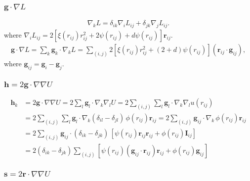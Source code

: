 \documentclass{article}
\begin{document}
\subsubsection{$\mathbf g \cdot \nabla L$}

\begin{align*}
\nabla_k L = \delta_{ik} \nabla_i L_{ij} + \delta_{jk} \nabla_j L_{ij}. 
\end{align*}
where $\nabla_i L_{ij} = 2 [ \xi(r_{ij}) r_{ij}^2 + 2 \psi(r_{ij}) + d \psi(r_{ij}) ] \mathbf r_{ij}$.
\begin{align*}
\mathbf g \cdot \nabla L
= \sum_k \mathbf g_k \cdot \nabla_k L
= \sum_{(i, j)} 2 [ \xi(r_{ij}) r_{ij}^2 + (2 + d) \psi(r_{ij}) ] (\mathbf r_{ij} \cdot \mathbf g_{ij}),
\end{align*}
where $\mathbf g_{ij} = \mathbf g_i - \mathbf g_j$.



\subsubsection{$\mathbf h = 2 \mathbf g \cdot \nabla \nabla U$}

\begin{align*}
\mathbf h_k &= 2 \mathbf g \cdot \nabla \nabla U
  = 2 \sum_l \mathbf g_l \cdot \nabla_k \nabla_l U
  = 2 \sum_{(i, j)} \sum_l \mathbf g_l \cdot \nabla_k \nabla_l u(r_{ij})
\\
  &= 2 \sum_{(i, j)} \sum_l \mathbf g_l \cdot \nabla_k 
    (\delta_{il} - \delta_{jl}) \, \phi(r_{ij}) \mathbf r_{ij} 
  = 2 \sum_{(i, j)} \mathbf g_{ij} \cdot \nabla_k 
    \, \phi(r_{ij}) \mathbf r_{ij}
\\
  &= 2 \sum_{(i, j)} \mathbf g_{ij} \cdot 
    (\delta_{ik} - \delta_{jk}) \, 
    [\psi(r_{ij}) \mathbf r_{ij} \mathbf r_{ij}
    + \phi(r_{ij}) \mathbf I_{ij}]
\\
  &= 2 (\delta_{ik} - \delta_{jk}) 
      \sum_{(i, j)} [\psi(r_{ij}) (\mathbf g_{ij} \cdot \mathbf r_{ij}) \mathbf r_{ij}
    + \phi(r_{ij}) \mathbf g_{ij}]
\end{align*}



\subsubsection{$\mathbf s = 2 \mathbf r \cdot \nabla \nabla U$}
\end{document}
